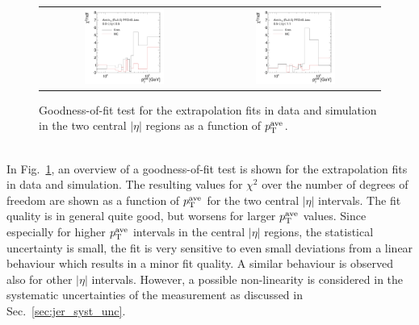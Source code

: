 \begin{figure}[!tp]
  \centering
  \begin{tabular}{cc}
                \includegraphics[width=0.49\textwidth]{figures/GoodnessOfFit_Eta0_final_nominal_v4.pdf} &
                \includegraphics[width=0.49\textwidth]{figures/GoodnessOfFit_Eta1_final_nominal_v4.pdf} \\
  \end{tabular}
  \caption{Goodness-of-fit test for the extrapolation fits in data and simulation in the two central $|\eta|$ regions as a function of $\pt^\mathrm{ave}$.}
  \label{fig:goodness-of-fit}
\end{figure}
\\
In Fig.~\ref{fig:goodness-of-fit}, an overview of a goodness-of-fit test is shown for the extrapolation fits in data and simulation. The resulting values for $\chi^2$ over the number of degrees of freedom are shown as a function of $\pt^\mathrm{ave}$ for the two central $|\eta|$ intervals. The fit quality is in general quite good, but worsens for larger $\pt^\mathrm{ave}$ values. Since especially for higher $\pt^\mathrm{ave}$ intervals in the central $|\eta|$ regions, the statistical uncertainty is small, the fit is very sensitive to even small deviations from a linear behaviour which results in a minor fit quality. A similar behaviour is observed also for other $|\eta|$ intervals. However, a possible non-linearity is considered in the systematic uncertainties of the measurement as discussed in Sec.~\ref{sec:jer_syst_unc}.

